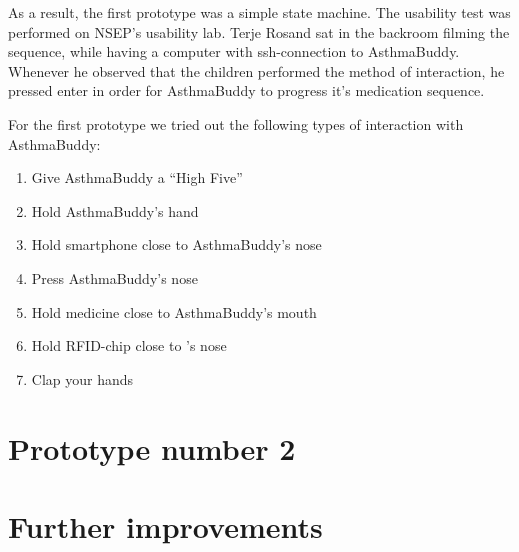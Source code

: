 As a result, the first prototype was a simple state machine. The usability test was performed on NSEP's usability lab. Terje  Rosand sat in the backroom filming the sequence, while having a computer with ssh-connection to AsthmaBuddy. Whenever he observed that the children performed the method of interaction, he pressed enter in order for AsthmaBuddy to progress it's medication sequence. 
 
For the first prototype we tried out the following types of interaction with AsthmaBuddy:
\begin{enumerate}
	\item{Give AsthmaBuddy a ``High Five''}
	\item{Hold AsthmaBuddy's hand}
	\item{Hold smartphone close to AsthmaBuddy's nose}
	\item{Press AsthmaBuddy's nose}
	\item{Hold medicine close to AsthmaBuddy's mouth}
	\item{Hold RFID-chip close to \buddy{}'s nose}
	\item{Clap your hands}
\end{enumerate}


\section{Prototype number 2}


\section{Further improvements}

 

 